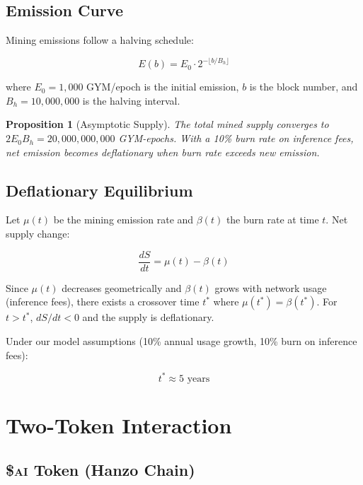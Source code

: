 \documentclass[11pt,letterpaper]{article}
\newtheorem{proposition}[theorem]{Proposition}
\newcommand{\AI}{\$\textsc{ai}}
\begin{document}
\subsection{Emission Curve}

Mining emissions follow a halving schedule:

\begin{equation}
    E(b) = E_0 \cdot 2^{-\lfloor b / B_h \rfloor}
    \label{eq:emission}
\end{equation}

where $E_0 = 1{,}000$ GYM/epoch is the initial emission, $b$ is the block number, and $B_h = 10{,}000{,}000$ is the halving interval.

\begin{proposition}[Asymptotic Supply]
The total mined supply converges to $2 E_0 B_h = 20{,}000{,}000{,}000$ GYM-epochs.  With a 10\% burn rate on inference fees, net emission becomes deflationary when burn rate exceeds new emission.
\end{proposition}

\subsection{Deflationary Equilibrium}

Let $\mu(t)$ be the mining emission rate and $\beta(t)$ the burn rate at time $t$.  Net supply change:

\begin{equation}
    \frac{dS}{dt} = \mu(t) - \beta(t)
\end{equation}

Since $\mu(t)$ decreases geometrically and $\beta(t)$ grows with network usage (inference fees), there exists a crossover time $t^*$ where $\mu(t^*) = \beta(t^*)$.  For $t > t^*$, $dS/dt < 0$ and the supply is deflationary.

Under our model assumptions (10\% annual usage growth, 10\% burn on inference fees):

\begin{equation}
    t^* \approx 5 \text{ years}
\end{equation}

\section{Two-Token Interaction}
\label{sec:two-token}

\subsection{\AI{} Token (Hanzo Chain)}
\end{document}
